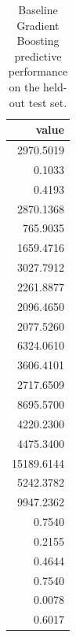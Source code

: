 \begin{table}
\caption{Baseline Gradient Boosting predictive performance on the held-out test set.}
\label{tab:05-gb-metrics}
\begin{tabular}{r}
\toprule
value \\
\midrule
2970.5019 \\
0.1033 \\
0.4193 \\
2870.1368 \\
765.9035 \\
1659.4716 \\
3027.7912 \\
2261.8877 \\
2096.4650 \\
2077.5260 \\
6324.0610 \\
3606.4101 \\
2717.6509 \\
8695.5700 \\
4220.2300 \\
4475.3400 \\
15189.6144 \\
5242.3782 \\
9947.2362 \\
0.7540 \\
0.2155 \\
0.4644 \\
0.7540 \\
0.0078 \\
0.6017 \\
\bottomrule
\end{tabular}
\end{table}

